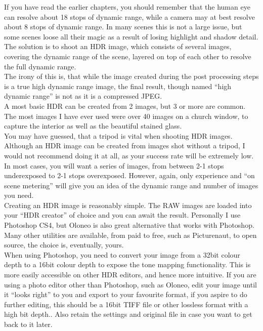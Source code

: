 If you have read the earlier chapters, you should remember that the human eye can resolve about 18 \glspl{stop} of dynamic range, while a camera may at best resolve about 8 \glspl{stop} of dynamic range. In many scenes this is not a large issue, but some scenes loose all their magic as a result of losing highlight and shadow detail. The solution is to shoot an \gls{HDR} image, which consists of several images, covering the dynamic range of the scene, layered on top of each other to resolve the full dynamic range.
\\
The irony of this is, that while the image created during the post processing steps is a true high dynamic range image, the final result, though named ``high dynamic range'' is not as it is a compressed \gls{JPEG}.
\\[\baselineskip]
A most basic \gls{HDR} can be created from 2 images, but 3 or more are common. The most images I have ever used were over 40 images on a church window, to capture the interior as well as the beautiful stained glass.
\\
You may have guessed, that a tripod is vital when shooting \gls{HDR} images. Although an \gls{HDR} image can be created from images shot without a tripod, I would not recommend doing it at all, as your success rate will be extremely low.
\\[\baselineskip]
In most cases, you will want a series of images, from between 2-1 \glspl{stop} underexposed to 2-1 \glspl{stop} overexposed. However, again, only experience and ``on scene metering'' will give you an idea of the dynamic range and number of images you need.
\\[\baselineskip]
Creating an \gls{HDR} image is reasonably simple. The \gls{RAW} images are loaded into your ``\gls{HDR} creator'' of choice and you can await the result. Personally I use Photoshop CS4, but Oloneo is also great alternative that works with Photoshop. Many other utilities are available, from paid to free, such as Picturenaut, to open source, the choice is, eventually, yours.
\\[\baselineskip]
When using Photoshop, you need to convert your image from a 32bit colour depth to a 16bit colour depth to expose the tone mapping functionality. This is more easily accessible on other \gls{HDR} editors, and hence more intuitive. If you are using a photo editor other than Photoshop, such as Oloneo, edit your image until it ``looks right'' to you and export to your favourite format, if you aspire to do further editing, this should be a 16bit TIFF file or other lossless format with a high bit depth.. Also retain the settings and original file in case you want to get back to it later.

